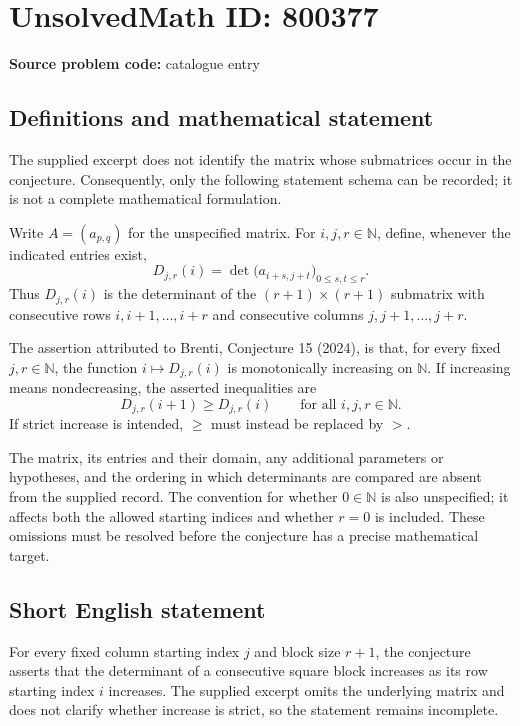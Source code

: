 \documentclass[11pt]{article}
\begin{document}
\section*{UnsolvedMath ID: 800377}
\textbf{Source problem code:} catalogue entry
\subsection{Definitions and mathematical statement}
The supplied excerpt does not identify the matrix whose submatrices occur in the conjecture. Consequently, only the following statement schema can be recorded; it is not a complete mathematical formulation.

Write \(A=(a_{p,q})\) for the unspecified matrix. For \(i,j,r\in\mathbb{N}\), define, whenever the indicated entries exist,
\[
D_{j,r}(i)=\det\bigl(a_{i+s,j+t}\bigr)_{0\le s,t\le r}.
\]
Thus \(D_{j,r}(i)\) is the determinant of the \((r+1)\times(r+1)\) submatrix with consecutive rows \(i,i+1,\ldots,i+r\) and consecutive columns \(j,j+1,\ldots,j+r\).

The assertion attributed to Brenti, Conjecture 15 (2024), is that, for every fixed \(j,r\in\mathbb{N}\), the function \(i\mapsto D_{j,r}(i)\) is monotonically increasing on \(\mathbb{N}\). If increasing means nondecreasing, the asserted inequalities are
\[
D_{j,r}(i+1)\ge D_{j,r}(i)
\qquad\text{for all }i,j,r\in\mathbb{N}.
\]
If strict increase is intended, \(\ge\) must instead be replaced by \(>\).

The matrix, its entries and their domain, any additional parameters or hypotheses, and the ordering in which determinants are compared are absent from the supplied record. The convention for whether \(0\in\mathbb{N}\) is also unspecified; it affects both the allowed starting indices and whether \(r=0\) is included. These omissions must be resolved before the conjecture has a precise mathematical target.
\subsection{Short English statement}
For every fixed column starting index \(j\) and block size \(r+1\), the conjecture asserts that the determinant of a consecutive square block increases as its row starting index \(i\) increases. The supplied excerpt omits the underlying matrix and does not clarify whether increase is strict, so the statement remains incomplete.
\end{document}
